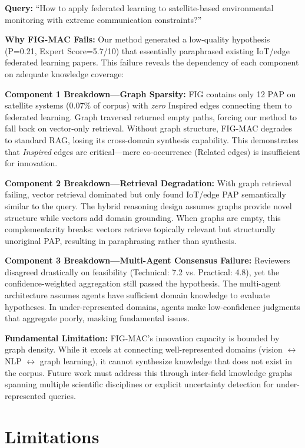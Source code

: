 \documentclass[runningheads]{llncs}
\begin{document}
\textbf{Query:} ``How to apply federated learning to satellite-based environmental monitoring with extreme communication constraints?''

\textbf{Why FIG-MAC Fails:} Our method generated a low-quality hypothesis (P=0.21, Expert Score=5.7/10) that essentially paraphrased existing IoT/edge federated learning papers. This failure reveals the dependency of each component on adequate knowledge coverage:

\textbf{Component 1 Breakdown---Graph Sparsity:} FIG contains only 12 PAP on satellite systems (0.07\% of corpus) with \emph{zero} Inspired edges connecting them to federated learning. Graph traversal returned empty paths, forcing our method to fall back on vector-only retrieval. Without graph structure, FIG-MAC degrades to standard RAG, losing its cross-domain synthesis capability. This demonstrates that \emph{Inspired} edges are critical---mere co-occurrence (Related edges) is insufficient for innovation.

\textbf{Component 2 Breakdown---Retrieval Degradation:} With graph retrieval failing, vector retrieval dominated but only found IoT/edge PAP semantically similar to the query. The hybrid reasoning design assumes graphs provide novel structure while vectors add domain grounding. When graphs are empty, this complementarity breaks: vectors retrieve topically relevant but structurally unoriginal PAP, resulting in paraphrasing rather than synthesis.

\textbf{Component 3 Breakdown---Multi-Agent Consensus Failure:} Reviewers disagreed drastically on feasibility (Technical: 7.2 vs. Practical: 4.8), yet the confidence-weighted aggregation still passed the hypothesis. The multi-agent architecture assumes agents have sufficient domain knowledge to evaluate hypotheses. In under-represented domains, agents make low-confidence judgments that aggregate poorly, masking fundamental issues.

\textbf{Fundamental Limitation:} FIG-MAC's innovation capacity is bounded by graph density. While it excels at connecting well-represented domains (vision $\leftrightarrow$ NLP $\leftrightarrow$ graph learning), it cannot synthesize knowledge that does not exist in the corpus. Future work must address this through inter-field knowledge graphs spanning multiple scientific disciplines or explicit uncertainty detection for under-represented queries.


\section{Limitations}
\label{sec:limitations}
\end{document}
